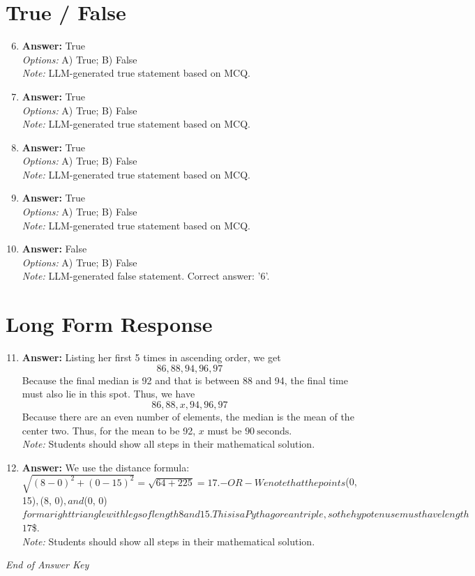 \documentclass[12pt]{article}
\begin{document}
\section*{True / False}
\begin{enumerate}[label=\arabic*.]
\setcounter{enumi}{5}
\item \textbf{Answer:} True
\\ \textit{Options:} A) True; B) False
\\ \textit{Note:} LLM-generated true statement based on MCQ.
\item \textbf{Answer:} True
\\ \textit{Options:} A) True; B) False
\\ \textit{Note:} LLM-generated true statement based on MCQ.
\item \textbf{Answer:} True
\\ \textit{Options:} A) True; B) False
\\ \textit{Note:} LLM-generated true statement based on MCQ.
\item \textbf{Answer:} True
\\ \textit{Options:} A) True; B) False
\\ \textit{Note:} LLM-generated true statement based on MCQ.
\item \textbf{Answer:} False
\\ \textit{Options:} A) True; B) False
\\ \textit{Note:} LLM-generated false statement. Correct answer: '6'.
\end{enumerate}

\section*{Long Form Response}
\begin{enumerate}[label=\arabic*.]
\setcounter{enumi}{10}
\item \textbf{Answer:} Listing her first 5 times in ascending order, we get \[86,88,94,96,97\] Because the final median is 92 and that is between 88 and 94, the final time must also lie in this spot. Thus, we have \[86,88,x,94,96,97\] Because there are an even number of elements, the median is the mean of the center two. Thus, for the mean to be 92, $x$ must be $\boxed{90}~\text{seconds}$.
\\ \textit{Note:} Students should show all steps in their mathematical solution.
\item \textbf{Answer:} We use the distance formula: $\sqrt{(8 - 0)^2 + (0 - 15)^2} = \sqrt{64 + 225} = \boxed {17}.$$- OR - We note that the points $(0, 15)$, $(8, 0)$, and $(0, 0)$ form a right triangle with legs of length 8 and 15. This is a Pythagorean triple, so the hypotenuse must have length $\ensuremath{\boxed{17}}\$.
\\ \textit{Note:} Students should show all steps in their mathematical solution.
\end{enumerate}

\vfill
\noindent\textit{End of Answer Key}
\end{document}
